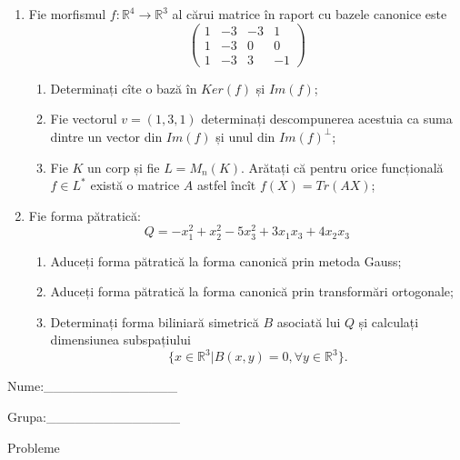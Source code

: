 \documentclass{article}
\begin{document}
\begin{enumerate}
 \item Fie morfismul $f:\mathbb{R}^4 \to \mathbb{R}^3$ al cărui matrice în raport cu bazele canonice este
$$\begin{pmatrix}
1&-3&-3&1\\
1&-3&0&0\\
1&-3&3&-1
\end{pmatrix}$$

\begin{enumerate}
\item Determinați cîte o bază în $Ker(f)$ și $Im(f)$;
\item Fie vectorul $v=(1,3,1)$ determinați descompunerea acestuia ca suma dintre un vector din $Im(f)$ și unul din $Im(f)^\perp$;
\item Fie $K$ un corp și fie $L=M_n(K)$. Arătați că pentru orice funcțională $f \in L^*$ există o matrice $A$ astfel încît $f(X)=Tr(AX)$;
\end{enumerate}
\item Fie forma pătratică:
$$Q= -x_1^2+x_2^2-5x_3^2+3x_1x_3+4x_2x_3$$

\begin{enumerate}
\item Aduceți forma pătratică la forma canonică prin metoda Gauss;
\item Aduceți forma pătratică la forma canonică prin transformări ortogonale;
\item Determinați forma biliniară simetrică $B$ asociată lui $Q$ și calculați dimensiunea subspațiului
$$\{x \in \mathbb{R}^3 | B(x,y)=0,\forall y \in \mathbb{R}^3\}.$$

\end{enumerate}
\end{enumerate}
\newpage
\begin{flushright}
Nume:\_\_\_\_\_\_\_\_\_\_\_\_\_\_
 
 
Grupa:\_\_\_\_\_\_\_\_\_\_\_\_\_\_
\end{flushright}
\begin{center}
\vspace{2cm}
{\Large Probleme}
\vspace{2cm}
\end{center}
\end{document}
